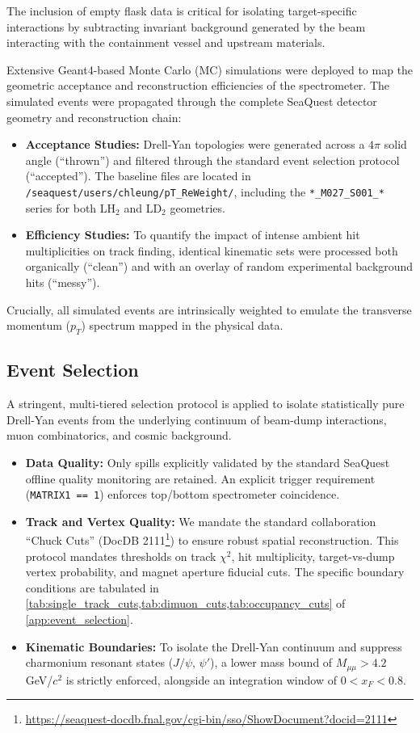 \documentclass[11pt]{article}
\begin{document}
The inclusion of empty flask data is critical for isolating target-specific interactions by subtracting invariant background generated by the beam interacting with the containment vessel and upstream materials.

Extensive Geant4-based Monte Carlo (MC) simulations were deployed to map the geometric acceptance and reconstruction efficiencies of the spectrometer. The simulated events were propagated through the complete SeaQuest detector geometry and reconstruction chain:
\begin{itemize}
    \item \textbf{Acceptance Studies:} Drell-Yan topologies were generated across a $4\pi$ solid angle (``thrown'') and filtered through the standard event selection protocol (``accepted''). The baseline files are located in \texttt{/seaquest/users/chleung/pT\_ReWeight/}, including the \texttt{*\_M027\_S001\_*} series for both LH$_2$ and LD$_2$ geometries.
    \item \textbf{Efficiency Studies:} To quantify the impact of intense ambient hit multiplicities on track finding, identical kinematic sets were processed both organically (``clean'') and with an overlay of random experimental background hits (``messy''). 
\end{itemize}
Crucially, all simulated events are intrinsically weighted to emulate the transverse momentum ($p_T$) spectrum mapped in the physical data.

\subsection{Event Selection}
\label{sec:event_selection}
A stringent, multi-tiered selection protocol is applied to isolate statistically pure Drell-Yan events from the underlying continuum of beam-dump interactions, muon combinatorics, and cosmic background.
\begin{itemize}
    \item \textbf{Data Quality:} Only spills explicitly validated by the standard SeaQuest offline quality monitoring are retained. An explicit trigger requirement (\texttt{MATRIX1 == 1}) enforces top/bottom spectrometer coincidence.
    \item \textbf{Track and Vertex Quality:} We mandate the standard collaboration ``Chuck Cuts'' (DocDB 2111\footnote{\url{https://seaquest-docdb.fnal.gov/cgi-bin/sso/ShowDocument?docid=2111}}) to ensure robust spatial reconstruction. This protocol mandates thresholds on track $\chi^2$, hit multiplicity, target-vs-dump vertex probability, and magnet aperture fiducial cuts. The specific boundary conditions are tabulated in \cref{tab:single_track_cuts,tab:dimuon_cuts,tab:occupancy_cuts} of \cref{app:event_selection}.
    \item \textbf{Kinematic Boundaries:} To isolate the Drell-Yan continuum and suppress charmonium resonant states ($J/\psi$, $\psi'$), a lower mass bound of $M_{\mu\mu} > 4.2$ GeV/$c^2$ is strictly enforced, alongside an integration window of $0 < x_F < 0.8$.
\end{itemize}
\end{document}
